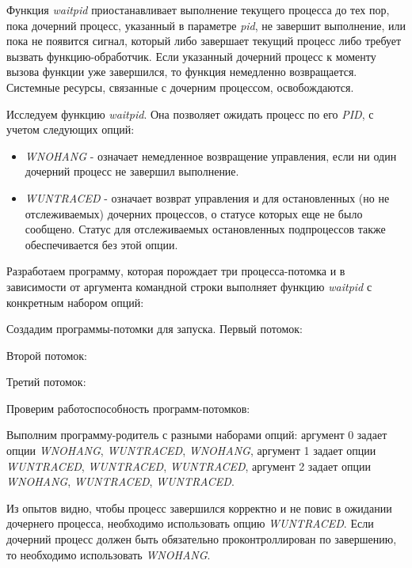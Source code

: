 \documentclass[14pt,a4paper,report]{report}
\begin{document}
Функция \emph{waitpid} приостанавливает выполнение текущего процесса до тех пор, пока дочерний процесс, указанный в параметре \emph{pid}, не завершит выполнение, или пока не появится сигнал, который либо завершает текущий процесс либо требует вызвать функцию-обработчик. Если указанный дочерний процесс к моменту вызова функции уже завершился, то функция немедленно возвращается. Системные ресурсы, связанные с дочерним процессом, освобождаются.

Исследуем функцию \emph{waitpid}. Она позволяет ожидать процесс по его \emph{PID}, с учетом следующих опций:

\begin{itemize}
	\item \emph{WNOHANG} - означает немедленное возвращение управления, если ни один дочерний процесс не завершил выполнение.
	\item \emph{WUNTRACED} - означает возврат управления и для остановленных (но не отслеживаемых) дочерних процессов, о статусе которых еще не было сообщено. Статус для отслеживаемых остановленных подпроцессов также обеспечивается без этой опции.
\end{itemize}

Разработаем программу, которая порождает три процесса-потомка и в зависимости от аргумента командной строки выполняет функцию \emph{waitpid} с конкретным набором опций:



Создадим программы-потомки для запуска. Первый потомок:



Второй потомок:



Третий потомок:



Проверим работоспособность программ-потомков:



Выполним программу-родитель с разными наборами опций: аргумент 0 задает опции \emph{WNOHANG}, \emph{WUNTRACED}, \emph{WNOHANG}, аргумент 1 задает опции \emph{WUNTRACED}, \emph{WUNTRACED}, \emph{WUNTRACED}, аргумент 2 задает опции \emph{WNOHANG}, \emph{WUNTRACED}, \emph{WUNTRACED}.



Из опытов видно, чтобы процесс завершился корректно и не повис в ожидании дочернего процесса, необходимо использовать опцию \emph{WUNTRACED}. Если дочерний процесс должен быть обязательно проконтроллирован по завершению, то необходимо использовать \emph{WNOHANG}.
\end{document}
